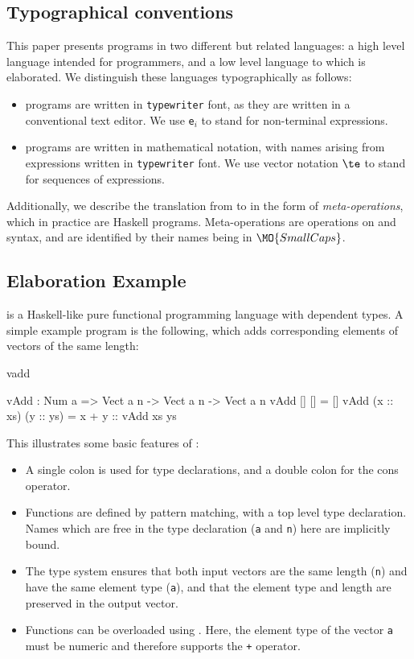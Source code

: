 \subsection{Typographical conventions}

This paper presents programs in two different but related languages: a high level
language \Idris{} intended for programmers, and a low level language \TT{} to
which \Idris{} is elaborated. We distinguish these languages typographically as
follows:

\begin{itemize}
\item \Idris{} programs are written in \texttt{typewriter} font, as they are written
in a conventional text editor. We use \texttt{e$_i$} to stand for non-terminal
expressions.
\item \TT{} programs are written in mathematical notation, with names arising
from \Idris{} expressions written in \texttt{typewriter} font. We use vector notation
$\te$ to stand for sequences of expressions.
\end{itemize}

Additionally, we describe the translation from \Idris{} to \TT{} in the form
of \emph{meta-operations}, which in practice are Haskell programs. Meta-operations
are operations on \Idris{} and \TT{} syntax, and are identified by their names being
in $\MO{SmallCaps}$.

\subsection{Elaboration Example}

\Idris{} is a Haskell-like pure functional programming language with dependent types.
A simple example program is the following, which adds corresponding elements of
vectors of the same length:

\begin{SaveVerbatim}{vadd}

vAdd : Num a => Vect a n -> Vect a n -> Vect a n
vAdd []        []        = []
vAdd (x :: xs) (y :: ys) = x + y :: vAdd xs ys

\end{SaveVerbatim}

\noindent
This illustrates some basic features of \Idris{}:

\begin{itemize}
\item A single colon is used for type declarations, and a double colon for the
cons operator.
\item Functions are defined by pattern matching, with a top level type declaration.
Names which are free in the type declaration (\texttt{a} and \texttt{n}) here
are implicitly bound.
\item The type system ensures that both input vectors are the same length (\texttt{n})
and have the same element type (\texttt{a}), and that the element type and length
are preserved in the output vector.
\item Functions can be overloaded using . Here, the element type
of the vector \texttt{a} must be numeric and therefore supports the \texttt{+} operator.
\end{itemize}

